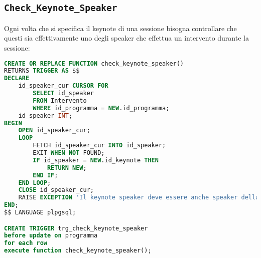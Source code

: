 \subsection{\texttt{Check\_Keynote\_Speaker}}
Ogni volta che si specifica il keynote di una sessione bisogna controllare che questi sia effettivamente uno degli speaker che effettua un intervento durante la sessione:
\begin{lstlisting}[language=SQL, caption={\texttt{Check\_Keynote\_Speaker}},style=mystyle]
CREATE OR REPLACE FUNCTION check_keynote_speaker()
RETURNS TRIGGER AS $$
DECLARE
    id_speaker_cur CURSOR FOR
        SELECT id_speaker
        FROM Intervento
        WHERE id_programma = NEW.id_programma;
    id_speaker INT;
BEGIN
    OPEN id_speaker_cur;
    LOOP
        FETCH id_speaker_cur INTO id_speaker;
        EXIT WHEN NOT FOUND;
        IF id_speaker = NEW.id_keynote THEN
            RETURN NEW;
        END IF;
    END LOOP;
    CLOSE id_speaker_cur;
    RAISE EXCEPTION 'Il keynote speaker deve essere anche speaker della sessione';
END;
$$ LANGUAGE plpgsql;

CREATE TRIGGER trg_check_keynote_speaker
before update on programma
for each row
execute function check_keynote_speaker();
\end{lstlisting}